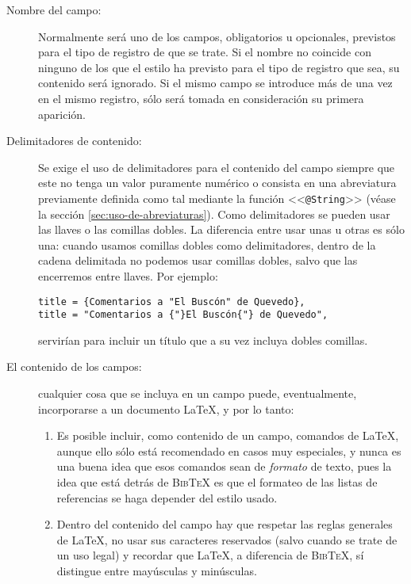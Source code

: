 \documentclass[a4paper,11pt]{article}
\def\btx-{\textsc{Bib\TeX}}
\def\ltx-{\LaTeX}
\def\ltr#1-{<<\texttt{#1}>>}
\begin{document}
\begin{description}

\item[Nombre del  campo:] Normalmente será  uno de los campos,  obligatorios u
  opcionales,  previstos para  el tipo  de registro  de que  se trate.   Si el
  nombre no coincide con ninguno de los que el estilo ha previsto para el tipo
  de  registro que  sea, su  contenido será  ignorado.  Si  el mismo  campo se
  introduce  más  de  una vez  en  el  mismo  registro,  sólo será  tomada  en
  consideración su primera aparición.

\item[Delimitadores de  contenido:] Se exige  el uso de delimitadores  para el
  contenido del campo siempre que este  no tenga un valor puramente numérico o
  consista  en  una abreviatura  previamente  definida  como  tal mediante  la
  función  \ltr  @String-  (véase la  sección  \ref{sec:uso-de-abreviaturas}).
  Como  delimitadores se  pueden usar  las llaves  o las  comillas  dobles. La
  diferencia  entre usar  unas u  otras es  sólo una:  cuando  usamos comillas
  dobles como  delimitadores, dentro de  la cadena delimitada no  podemos usar
  comillas dobles, salvo que las encerremos entre llaves. Por ejemplo:

  {\small
\begin{verbatim}
title = {Comentarios a "El Buscón" de Quevedo},
title = "Comentarios a {"}El Buscón{"} de Quevedo",
\end{verbatim}
  }

  servirían para incluir un título que a su vez incluya dobles comillas.


\item[El contenido de  los campos:] cualquier cosa que se  incluya en un campo
  puede, eventualmente, incorporarse a un documento \ltx-, y por lo tanto:

  \begin{enumerate}

  \item Es  posible incluir,  como contenido de  un campo, comandos  de \ltx-,
    aunque ello sólo está recomendado en  casos muy especiales, y nunca es una
    buena idea que esos comandos sean de \emph{formato} de texto, pues la idea
    que está detrás  de \btx- es que el formateo de  las listas de referencias
    se haga depender del estilo usado.

  \item Dentro del  contenido del campo hay que  respetar las reglas generales
    de \ltx-, no  usar sus caracteres reservados (salvo cuando  se trate de un
    uso legal) y recordar que \ltx-, a diferencia de \btx-, sí distingue entre
    mayúsculas y minúsculas.


\end{enumerate}
\end{description}
\end{document}
